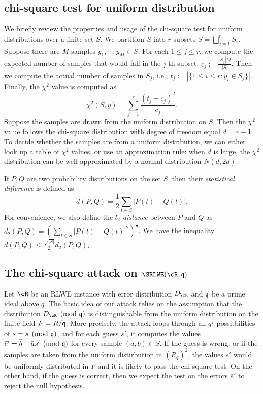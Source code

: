 \documentclass{amsart}
\begin{document}
\subsection{chi-square test for uniform distribution}
We briefly review the properties and usage of the chi-square test for uniform distributions over a finite set $S$. We partition $S$ into $r$ subsets $S = \bigsqcup_{j=1}^r S_i$.
Suppose there are $M$ samples $y_1, \cdots, y_M \in S$.
For each $1 \leq j \leq r$, we compute the expected number of samples that would fall in the $j$-th subset: $c_j := \frac{|S_j|M}{|S|}$. Then we compute the actual number of samples in $S_j$, i.e., $t_j := |\{1 \leq i \leq r: y_i \in S_j\}|$. Finally, the $\chi^2$ value is computed as
\[
    \chi^2(S,y) = \sum_{j = 1}^r \frac{(t_j -c_j)^2}{c_j}.
\]
Suppose the samples are drawn from the uniform distribution on $S$. Then the $\chi^2$ value follows the chi-square distribution with degree of freedom equal $d = r-1$.
To decide whether the samples are from a uniform distribution, we can either look up a table of $\chi^2$ values, or use an approximation rule:  when $d$ is large, the $\chi^2$ distribution can be well-approximated by a normal distribution $N(d, 2d)$.

If $P,Q$ are two probability distributions on the set $S$, then their {\it statistical difference} is defined as
\[
    d(P,Q) = \frac{1}{2} \sum_{t \in S} |P(t) - Q(t)|.
\]
For convenience, we also define the {\it $l_2$ distance} between $P$ and $Q$ as $d_2(P,Q) = (\sum_{t \in S} |P(t) - Q(t)|^2)^{\frac{1}{2}}$. We have the inequality $d(P,Q) \leq \frac{\sqrt{|S|}}{2}d_2(P,Q)$.



\subsection{The chi-square attack on $\SRLWE(\cR,\fq)$}

Let $\cR$ be an RLWE instance with error distribution $D_{\cR}$ and $\mathfrak{q}$ be a prime ideal above $q$.  The basic idea of our attack relies on the assumption that the distribution $D_\cR \pmod {\fq}$ is distinguishable from the uniform distribution on the finite field $F = R/\mathfrak{q}$. More precisely, the attack loops through all $q^f$ possitbilities of $\bar{s} = s \pmod{\mathfrak{q}}$, and for each guess $s'$, it computes the values $\bar{e}' = \bar{b} - \bar{a} s' \pmod {\mathfrak{q}}$ for every sample $(a,b) \in S$. If the guess is wrong, or if the samples are taken from the uniform distirbution in $(R_q)^2$, the values $\bar{e}'$ would be uniformly distributed in $F$ and it is likely to pass the chi-square test. On the other hand, if the guess is correct, then we expect the test on the errors $\bar{e}'$ to reject the null hypothesis.
\end{document}
